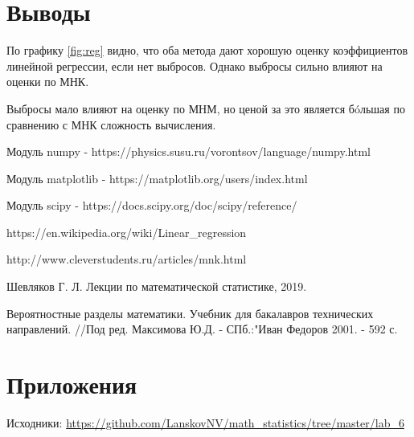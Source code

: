 \documentclass[12pt]{article}
\begin{document}
\section{Выводы}
По графику \ref{fig:reg} видно, что оба метода дают хорошую оценку коэффициентов линейной регрессии, если нет выбросов. Однако выбросы сильно влияют на оценки по МНК.

Выбросы мало влияют на оценку по МНМ, но ценой за это является б\'oльшая по сравнению с МНК сложность вычисления.



\begin{thebibliography}{}
      Модуль numpy  -  https://physics.susu.ru/vorontsov/language/numpy.html
    
    Модуль matplotlib - https://matplotlib.org/users/index.html
    
    Модуль scipy - https://docs.scipy.org/doc/scipy/reference/
    
    https://en.wikipedia.org/wiki/Linear\_regression

http://www.cleverstudents.ru/articles/mnk.html

Шевляков Г. Л. Лекции по математической статистике, 2019.

Вероятностные разделы математики. Учебник для бакалавров технических направлений. //Под ред. Максимова Ю.Д. - СПб.:"Иван Федоров 2001. - 592 с.


\end{thebibliography}

\section{Приложения}

Исходники: \url{https://github.com/LanskovNV/math_statistics/tree/master/lab_6}
\end{document}
